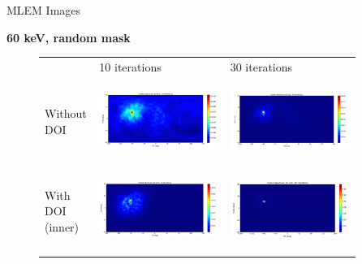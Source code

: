 \documentclass[xcolor=x11names,compress]{beamer}
\renewcommand{\(}{\begin{columns}}
\renewcommand{\)}{\end{columns}}
\newcommand{\<}[1]{\begin{column}{#1}}
\renewcommand{\>}{\end{column}}
\begin{document}
\begin{frame}{MLEM Images}

\textbf{60 keV, random mask}
\vspace{-2ex}

\begin{figure}
\begin{tabular}{m{0.12\linewidth} m{0.4\linewidth} m{0.4\linewidth}}
	& 10 iterations & 30 iterations \\
	Without DOI & \includegraphics[height=75pt, width=135pt]{Figures/MLEM_60_noDOI_HP912_10itr.png} & 
	\includegraphics[height=75pt, width=135pt]{Figures/MLEM_60_noDOI_HP912_30itr.png} \\
	With DOI (inner) & \includegraphics[height=75pt, width=135pt]{Figures/MLEM_60_DOI_HP912_10itr.png} & 
	\includegraphics[height=75pt, width=135pt]{Figures/MLEM_60_DOI_HP912_30itr.png}
\end{tabular}
\end{figure}

\end{frame}
\end{document}
